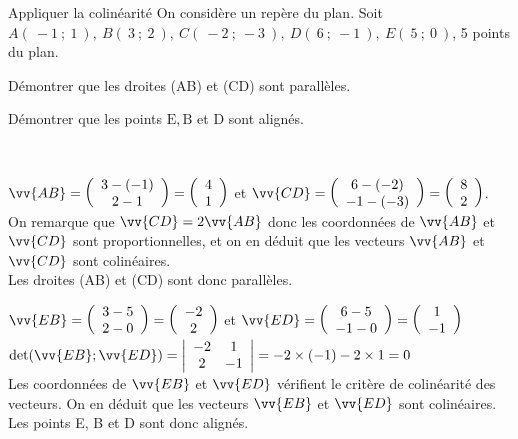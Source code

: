 \documentclass[11pt,a4paper]{article}  %
\begin{document}
\begin{bmethodet}{Appliquer la colinéarité}
	On considère \Rij un repère du plan. Soit $A(\ -1\ ;\ 1\ ),\ B(\ 3\ ;\ 2\ ),\ C(\ -2\ ;\ -3\ ),\ D(\ 6\ ;\ -1\ ),\ E(\ 5\ ;\ 0\ )$, 5 points du plan.
	\begin{enumMet}
		\item Démontrer que les droites (AB) et (CD) sont parallèles.
		\item Démontrer que les points $\mathrm{E}, \mathrm{B}$ et $\mathrm{D}$ sont alignés.
	\end{enumMet}
	\\
	\begin{enumMet}
		\item $\vv{A B}=\left(\begin{array}{c}3-(-1) \\ 2-1\end{array}\right)=\left(\begin{array}{l}4 \\ 1\end{array}\right)$ et $\vv{C D}=\left(\begin{array}{c}6-(-2) \\ -1-(-3)\end{array}\right)=\left(\begin{array}{l}8 \\ 2\end{array}\right)$.\\
		On remarque que $\vv{C D}=2 \vv{A B}$ donc les coordonnées de $\vv{A B}$ et $\vv{C D}$ sont proportionnelles, et on en déduit que les vecteurs $\vv{A B}$ et $\vv{C D}$ sont colinéaires.\\
		Les droites (AB) et (CD) sont donc parallèles.
		\item $\vv{E B}=\left(\begin{array}{c}3-5 \\ 2-0\end{array}\right)=\left(\begin{array}{c}-2 \\ 2\end{array}\right)$ et $\vv{E D}=\left(\begin{array}{c}6-5 \\ -1-0\end{array}\right)=\left(\begin{array}{c}1 \\ -1\end{array}\right)$\\
		$\operatorname{det}(\vv{E B} ; \vv{E D})=\left|\begin{array}{cc}-2 & 1 \\ 2 & -1\end{array}\right|=-2 \times(-1)-2 \times 1=0$\\
		Les coordonnées de $\vv{E B}$ et $\vv{E D}$ vérifient le critère de colinéarité des vecteurs.
		On en déduit que les vecteurs $\vv{E B}$ et $\vv{E D}$ sont colinéaires.\\
		Les points E, B et D sont donc alignés.
	\end{enumMet}
\end{bmethodet}
\end{document}
